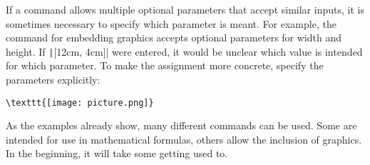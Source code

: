 If a command allows multiple optional parameters that accept similar inputs, it is sometimes necessary to specify which parameter is meant. 
For example, the command for embedding graphics accepts optional parameters for width and height. 
If \texttt|[12cm, 4cm]| were entered, it would be unclear which value is intended for which parameter. 
To make the assignment more concrete,  specify the parameters explicitly:
\begin{verbatim}
\texttt{[image: picture.png]}
\end{verbatim}

As the examples already show, many different commands can be used. 
Some are intended for use in mathematical formulas, others allow the inclusion of graphics. 
In the beginning, it will take some getting used to. 

